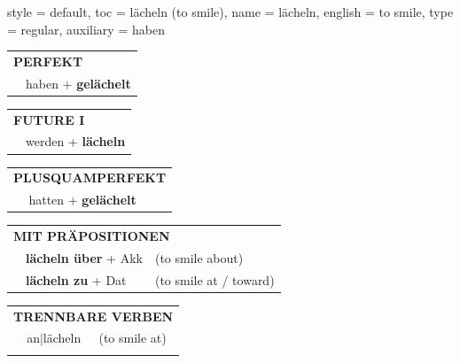 \begin{verbentry}{
  style = {default},
  toc = {lächeln (to smile)},
  name = {lächeln},
  english = {to smile},
  type = {regular},
  auxiliary = {haben}
}
\vspace{10pt}

\begin{tabular}{rl}
\multicolumn{2}{l}{\textbf{PERFEKT}}\\
& haben + \textbf{gelächelt}\\
\end{tabular}
\hfill
\begin{tabular}{rl}
\multicolumn{2}{l}{\textbf{FUTURE I}}\\
& werden + \textbf{lächeln}\\
\end{tabular}
\hfill
\begin{tabular}{rl}
\multicolumn{2}{l}{\textbf{PLUSQUAMPERFEKT}}\\
& hatten + \textbf{gelächelt}\\
\end{tabular}

\vspace{10pt}

\begin{tabular}{lll}
\multicolumn{3}{l}{\textbf{MIT PRÄPOSITIONEN}}\\
& \textbf{lächeln über} + Akk & (to smile about)\\
& \textbf{lächeln zu} + Dat & (to smile at / toward)\\
\end{tabular}
\hfill
\begin{tabular}{lll}
\multicolumn{3}{l}{\textbf{TRENNBARE VERBEN}}\\
& an$|$lächeln & (to smile at)\\
\vspace{10pt}
\end{tabular}

\vspace{-5pt}
\end{verbentry}

